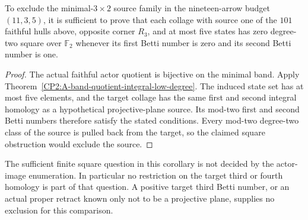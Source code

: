 \begin{corollary}
\label{CP2:A-three-by-two-eleven-finite-square-cover}
To exclude the minimal-$3\times2$ source family in the
nineteen-arrow budget $(11,3,5)$, it is sufficient to
prove that each collage with source one of the $101$
faithful hulls above, opposite corner $R_3$, and at most
five states has zero degree-two square over $\mathbb F_2$
whenever its first Betti number is zero and its second
Betti number is one.
\end{corollary}
\begin{proof}
The actual faithful actor quotient is bijective on the
minimal band.  Apply
Theorem~\ref{CP2:A-band-quotient-integral-low-degree}.
The induced state set has at most five elements, and
the target collage has the same first and second
integral homology as a hypothetical projective-plane
source.  Its mod-two first and second Betti numbers
therefore satisfy the stated conditions.  Every
mod-two degree-two class of the source is pulled back
from the target, so the claimed square obstruction
would exclude the source.
\end{proof}

The sufficient finite square question in this corollary
is not decided by the actor-image enumeration.
In particular no restriction on the target third or
fourth homology is part of that question.  A positive
target third Betti number, or an actual proper retract
known only not to be a projective plane, supplies no
exclusion for this comparison.
